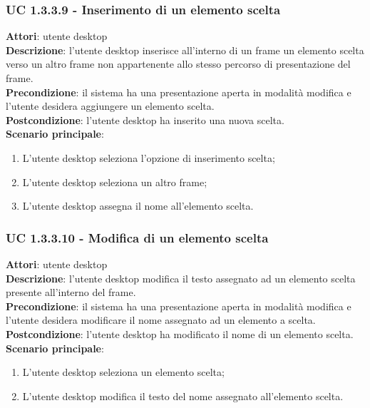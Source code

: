 \subsubsection{UC 1.3.3.9 - Inserimento di un elemento scelta}{
	\label{uc1.3.3.9}
	\textbf{Attori}: utente desktop \\
	\textbf{Descrizione}: l'utente desktop inserisce all'interno di un frame un elemento scelta verso un altro frame non appartenente allo stesso percorso di presentazione del frame. \\
	\textbf{Precondizione}: il sistema ha una presentazione aperta in modalità modifica e l'utente desidera aggiungere un elemento scelta.	\\
	\textbf{Postcondizione}: l'utente desktop ha inserito una nuova scelta.	\\
	\textbf{Scenario principale}:
	\begin{enumerate}
		\item L'utente desktop seleziona l'opzione di inserimento scelta;
		\item L'utente desktop seleziona un altro frame;
		\item L'utente desktop assegna il nome all'elemento scelta.
	\end{enumerate}
	}
\subsubsection{UC 1.3.3.10 - Modifica di un elemento scelta}{
	\label{uc1.3.3.10}
	\textbf{Attori}: utente desktop \\
	\textbf{Descrizione}: l'utente desktop modifica il testo assegnato ad un elemento scelta presente all'interno del frame. \\
	\textbf{Precondizione}: il sistema ha una presentazione aperta in modalità modifica e l'utente desidera modificare il nome assegnato ad un elemento a scelta.	\\
	\textbf{Postcondizione}: l'utente desktop ha modificato il nome di un elemento scelta.	\\
	\textbf{Scenario principale}:
	\begin{enumerate}
		\item L'utente desktop seleziona un elemento scelta;
		\item L'utente desktop modifica il testo del nome assegnato all'elemento scelta.
	\end{enumerate}
	}
